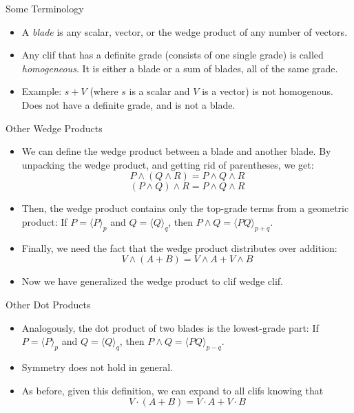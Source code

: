 \documentclass[aspectratio=169,xcolor=dvipsnames]{beamer}
\begin{document}


\begin{frame}{Some Terminology}


\begin{itemize}
      \item A \textit{blade} is any scalar, vector, or the wedge product of any number of
            vectors.
      \item Any clif that has a definite grade (consists of one single grade)
            is called \textit{homogeneous}. It is either a blade or a sum of blades,
            all of the same grade.
      \item Example: $s + V$ (where $s$ is a scalar and $V$ is a vector) is not homogenous. 
            Does not have a definite grade, and is not a blade.
\end{itemize}
\end{frame}
      


\begin{frame}{Other Wedge Products}


\begin{itemize}
      \item We can define the wedge product between a blade and another blade. By unpacking
            the wedge product, and getting rid of parentheses, we get:
            $$P \land (Q \land R) = P\land Q\land R$$
            $$(P \land Q) \land R = P\land Q\land R$$
      \item Then, the wedge product contains only the top-grade terms from a geometric
            product:
            If $P = \langle P \rangle_p$ and $Q = \langle Q \rangle_q$, then $P \land Q = \langle PQ \rangle_{p+q}$.
      \item Finally, we need the fact that the wedge product distributes over addition:
            $$V \land (A + B) = V \land A + V \land B$$
      \item Now we have generalized the wedge product to clif wedge clif.

\end{itemize}
\end{frame}
      


\begin{frame}{Other Dot Products}


\begin{itemize}
      \item Analogously, the dot product of two blades is the lowest-grade part: 
            If $P = \langle P \rangle_p$ and $Q = \langle Q \rangle_q$, then $P \land Q = \langle PQ \rangle_{p-q}$.
      \item Symmetry does not hold in general.
      \item As before, given this definition, we can expand to all clifs knowing that
            $$V \cdot (A+B) = V\cdot A + V \cdot B$$


\end{itemize}
\end{frame}
      
\end{document}
